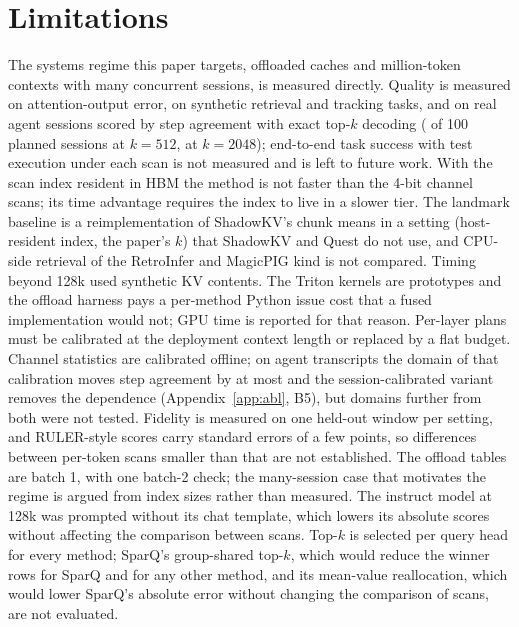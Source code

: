 \documentclass[10pt,twocolumn]{article}
\begin{document}
\section{Limitations}\label{sec:limits}
The systems regime this paper targets, offloaded caches and million-token contexts with many concurrent sessions, is measured directly. Quality is measured on attention-output error, on synthetic retrieval and tracking tasks, and on real agent sessions scored by step agreement with exact top-$k$ decoding (\agentN{} of 100 planned sessions at $k=512$, \agentNBig{} at $k=2048$); end-to-end task success with test execution under each scan is not measured and is left to future work. With the scan index resident in HBM the method is not faster than the 4-bit channel scans; its time advantage requires the index to live in a slower tier. The landmark baseline is a reimplementation of ShadowKV's chunk means in a setting (host-resident index, the paper's $k$) that ShadowKV and Quest do not use, and CPU-side retrieval of the RetroInfer and MagicPIG kind is not compared. Timing beyond 128k used synthetic KV contents. The Triton kernels are prototypes and the offload harness pays a per-method Python issue cost that a fused implementation would not; GPU time is reported for that reason. Per-layer plans must be calibrated at the deployment context length or replaced by a flat budget. Channel statistics are calibrated offline; on agent transcripts the domain of that calibration moves step agreement by at most \agentPairedAgentEightyWiki{} and the session-calibrated variant removes the dependence (Appendix~\ref{app:abl}, B5), but domains further from both were not tested. Fidelity is measured on one held-out window per setting, and RULER-style scores carry standard errors of a few points, so differences between per-token scans smaller than that are not established. The offload tables are batch 1, with one batch-2 check; the many-session case that motivates the regime is argued from index sizes rather than measured. The instruct model at 128k was prompted without its chat template, which lowers its absolute scores without affecting the comparison between scans. Top-$k$ is selected per query head for every method; SparQ's group-shared top-$k$, which would reduce the winner rows for SparQ and for any other method, and its mean-value reallocation, which would lower SparQ's absolute error without changing the comparison of scans, are not evaluated.
\end{document}
